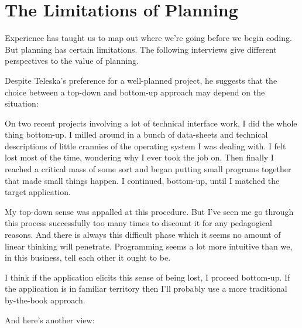 \section{The Limitations of Planning}

Experience has taught us to map out where we're going before we begin
coding. But planning has certain limitations. The following interviews
give different perspectives to the value of planning.

\begin{interview}
\noindent Despite Teleska's preference for a well-planned project, he
suggests that the choice between a top-down and bottom-up approach may
depend on the situation:

\begin{tfquot}
On two recent projects involving a lot of technical interface work, I
did the whole thing bottom-up. I milled around in a bunch of
data-sheets and technical descriptions of little crannies of the
operating system I was dealing with. I felt lost most of the time,
wondering why I ever took the job on.  Then finally I reached a
critical mass of some sort and began putting small programs together
that made small things happen. I continued, bottom-up, until I matched
the target application.

My top-down sense was appalled at this procedure. But I've seen me go
through this process successfully too many times to discount it for
any pedagogical reasons. And there is always this difficult phase
which it seems no amount of linear thinking will penetrate.
Programming seems a lot more intuitive than we, in this business, tell
each other it ought to be.

I think if the application elicits this sense of being lost, I proceed
bottom-up. If the application is in familiar territory then I'll
probably use a more traditional by-the-book approach.
\end{tfquot}
\end{interview}


\noindent And here's another view:

